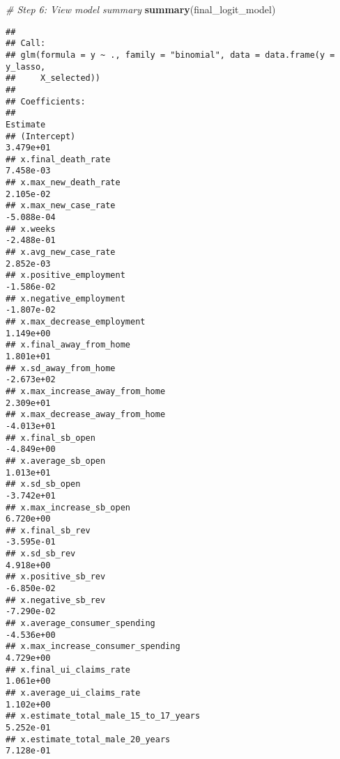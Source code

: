 \documentclass[
]{article}
\newenvironment{Shaded}{\begin{snugshade}}{\end{snugshade}}
\newcommand{\CommentTok}[1]{\textcolor[rgb]{0.56,0.35,0.01}{\textit{#1}}}
\newcommand{\FunctionTok}[1]{\textcolor[rgb]{0.13,0.29,0.53}{\textbf{#1}}}
\newcommand{\NormalTok}[1]{#1}
\begin{document}
\begin{Shaded}
\begin{Highlighting}[]
\CommentTok{\# Step 6: View model summary}
\FunctionTok{summary}\NormalTok{(final\_logit\_model)}
\end{Highlighting}
\end{Shaded}

\begin{verbatim}
## 
## Call:
## glm(formula = y ~ ., family = "binomial", data = data.frame(y = y_lasso, 
##     X_selected))
## 
## Coefficients:
##                                                               Estimate
## (Intercept)                                                  3.479e+01
## x.final_death_rate                                           7.458e-03
## x.max_new_death_rate                                         2.105e-02
## x.max_new_case_rate                                         -5.088e-04
## x.weeks                                                     -2.488e-01
## x.avg_new_case_rate                                          2.852e-03
## x.positive_employment                                       -1.586e-02
## x.negative_employment                                       -1.807e-02
## x.max_decrease_employment                                    1.149e+00
## x.final_away_from_home                                       1.801e+01
## x.sd_away_from_home                                         -2.673e+02
## x.max_increase_away_from_home                                2.309e+01
## x.max_decrease_away_from_home                               -4.013e+01
## x.final_sb_open                                             -4.849e+00
## x.average_sb_open                                            1.013e+01
## x.sd_sb_open                                                -3.742e+01
## x.max_increase_sb_open                                       6.720e+00
## x.final_sb_rev                                              -3.595e-01
## x.sd_sb_rev                                                  4.918e+00
## x.positive_sb_rev                                           -6.850e-02
## x.negative_sb_rev                                           -7.290e-02
## x.average_consumer_spending                                 -4.536e+00
## x.max_increase_consumer_spending                             4.729e+00
## x.final_ui_claims_rate                                       1.061e+00
## x.average_ui_claims_rate                                     1.102e+00
## x.estimate_total_male_15_to_17_years                         5.252e-01
## x.estimate_total_male_20_years                               7.128e-01

\end{verbatim}
\end{document}
